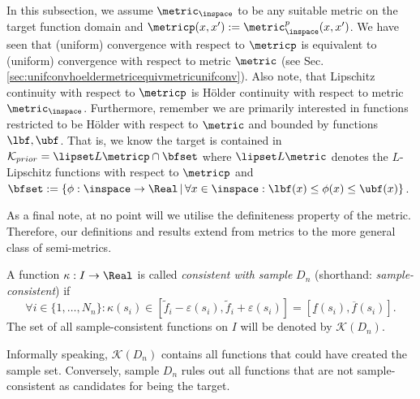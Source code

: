 In this subsection, we assume $\metric_\inspace$ to be any suitable metric on the target function domain and  $\metricp(x,x') := \metric_\inspace^p(x,x')$. We have seen that (uniform) convergence with respect to $\metricp$ is equivalent to (uniform) convergence with respect to metric $\metric$ (see Sec. \ref{sec:unifconvhoeldermetricequivmetricunifconv}). Also note, that Lipschitz continuity with respect to $\metricp$ is H\"older continuity with respect to metric $\metric_\inspace$. %
Furthermore, remember we are primarily interested in functions restricted to be H\"older with respect to $\metric$ and bounded by functions $\lbf,\ubf$. That is, we know the target is contained in $\mathcal K_{prior} = \lipset L \metricp  \cap \bfset$ where $\lipset L \metric$ denotes the $L$- Lipschitz functions with respect to  $\metricp$ and $\bfset :=\{\phi : \inspace \to \Real \, | \, \forall x \in \inspace : \lbf(x) \leq \phi(x) \leq \ubf(x)\} $. 

As a final note, at no point will we utilise the definiteness property of the metric. Therefore, our definitions and results extend from metrics to the more general class of semi-metrics.

%


\begin{defn}
A function $\kappa: I \to \Real$ is called \textit{consistent with sample} $D_n$ (shorthand: \emph{sample-consistent}) if \[ \forall i \in \{1,\ldots,N_n\}: \kappa(s_i) \in [\tilde f_i - \varepsilon(s_i), \tilde f_i + \varepsilon(s_i)  ] =[\underline f(s_i),\overline f(s_i) ].\] The set of all sample-consistent functions on $I$ will be denoted by $\mathcal K(D_n)$.
\end{defn}
Informally speaking, $\mathcal K(D_n)$ contains all functions that could have created the sample set. Conversely, sample $D_n$ rules out all functions that are not sample-consistent as candidates for being the target. 

